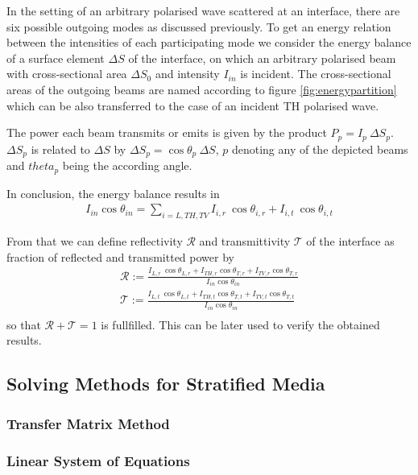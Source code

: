 In the setting of an arbitrary polarised wave scattered at an interface,
there are six possible outgoing modes as discussed previously.
To get an energy relation between the intensities of each
participating mode we consider the energy balance of a surface element
$\Delta S$ of the interface, on which an arbitrary polarised beam with
cross-sectional
area $\Delta S_{0}$ and intensity $I_{in}$ is incident. The cross-sectional
areas of the outgoing beams are named according to figure
\ref{fig:energypartition} which can be also transferred to the case of an
incident TH polarised wave.

The power each beam transmits or emits is given by the product $P_p = I_p\
    \Delta S_p$. $\Delta S_p$ is related to $\Delta S$ by $\Delta S_p =
    \cos\theta_p\ \Delta S$,
$p$ denoting any of the depicted beams and $theta_p$ being the according angle.

In conclusion, the energy balance results in
\begin{align}
    I_{in} \cos\theta_{in} = \sum\limits_{i=L,TH,TV} I_{i,r}\  \cos\theta_{i,r}
    + I_{i,t}\	\cos\theta_{i,t}
\end{align}

From that we can define reflectivity $\mathcal{R}$ and transmittivity $\mathcal{T}$ of the
interface as fraction of reflected and transmitted power by
\begin{align}
    \mathcal{R} := \frac{ I_{L,r}\  \cos\theta_{L,r} + I_{TH,r}  \cos\theta_{T,r} +
    I_{TV,r}  \cos\theta_{T,r}}{I_{in} \cos\theta_{in}} \\
    \mathcal{T} := \frac{ I_{L,t}\  \cos\theta_{L,t} + I_{TH,t}  \cos\theta_{T,t} +
    I_{TV,t}  \cos\theta_{T,t}}{I_{in} \cos\theta_{in}} \\
\end{align}
so that $\mathcal{R} + \mathcal{T} = 1$ is fullfilled. This can be later used to verify the
obtained results.

\subsection{Solving Methods for Stratified Media}

\subsubsection{Transfer Matrix Method}

\subsubsection{Linear System of Equations}